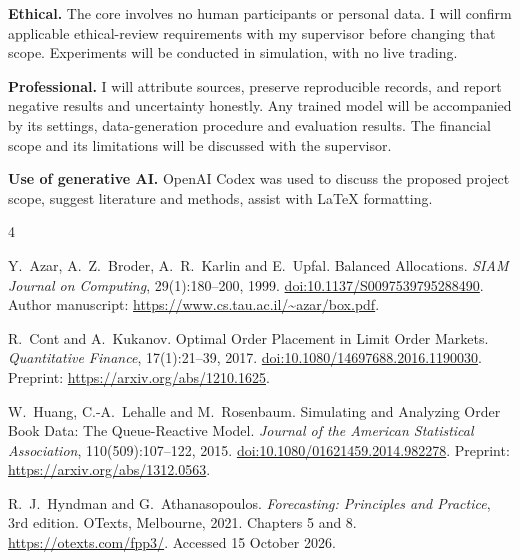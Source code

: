 \documentclass[10pt,a4paper,oneside]{article}
\begin{document}
\textbf{Ethical.} The core involves no human participants or personal data. I will confirm applicable ethical-review requirements with my supervisor before changing that scope. Experiments will be conducted in simulation, with no live trading.

\textbf{Professional.} I will attribute sources, preserve reproducible records, and report negative results and uncertainty honestly. Any trained model will be accompanied by its settings, data-generation procedure and evaluation results. The financial scope and its limitations will be discussed with the supervisor.

\textbf{Use of generative AI.} OpenAI Codex was used to discuss the proposed project scope, suggest literature and methods, assist with LaTeX formatting.


\begin{thebibliography}{4}
\raggedright

Y.~Azar, A.~Z.~Broder, A.~R.~Karlin and E.~Upfal.
\newblock Balanced Allocations.
\newblock \emph{SIAM Journal on Computing}, 29(1):180--200, 1999.
\newblock \href{https://doi.org/10.1137/S0097539795288490}{doi:10.1137/S0097539795288490}.
\newblock Author manuscript: \url{https://www.cs.tau.ac.il/~azar/box.pdf}.

R.~Cont and A.~Kukanov.
\newblock Optimal Order Placement in Limit Order Markets.
\newblock \emph{Quantitative Finance}, 17(1):21--39, 2017.
\newblock \href{https://doi.org/10.1080/14697688.2016.1190030}{doi:10.1080/14697688.2016.1190030}.
\newblock Preprint: \url{https://arxiv.org/abs/1210.1625}.

W.~Huang, C.-A.~Lehalle and M.~Rosenbaum.
\newblock Simulating and Analyzing Order Book Data: The Queue-Reactive Model.
\newblock \emph{Journal of the American Statistical Association}, 110(509):107--122, 2015.
\newblock \href{https://doi.org/10.1080/01621459.2014.982278}{doi:10.1080/01621459.2014.982278}.
\newblock Preprint: \url{https://arxiv.org/abs/1312.0563}.

R.~J.~Hyndman and G.~Athanasopoulos.
\newblock \emph{Forecasting: Principles and Practice}, 3rd edition.
\newblock OTexts, Melbourne, 2021. Chapters 5 and 8.
\newblock \url{https://otexts.com/fpp3/}.
\newblock Accessed 15 October 2026.

\end{thebibliography}
\end{document}
